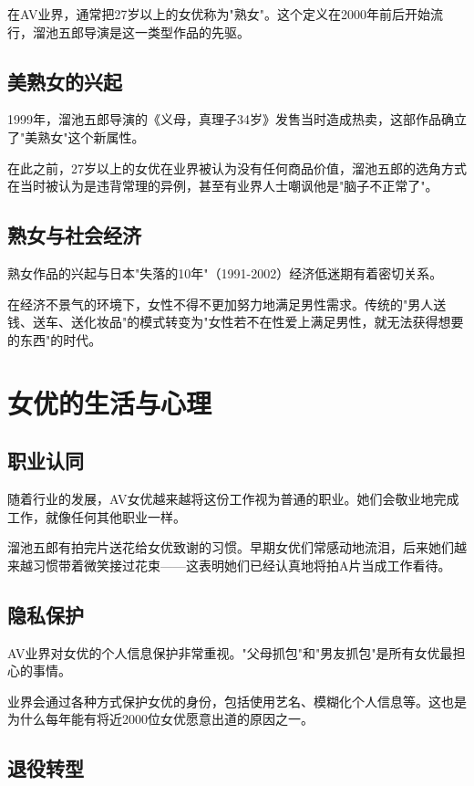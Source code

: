 \documentclass[12pt,UTF8]{ctexbook}
\begin{document}
在AV业界，通常把27岁以上的女优称为"熟女"。这个定义在2000年前后开始流行，溜池五郎导演是这一类型作品的先驱。

\section{美熟女的兴起}

1999年，溜池五郎导演的《义母，真理子34岁》发售当时造成热卖，这部作品确立了"美熟女"这个新属性。

在此之前，27岁以上的女优在业界被认为没有任何商品价值，溜池五郎的选角方式在当时被认为是违背常理的异例，甚至有业界人士嘲讽他是"脑子不正常了"。

\section{熟女与社会经济}

熟女作品的兴起与日本"失落的10年"（1991-2002）经济低迷期有着密切关系。

在经济不景气的环境下，女性不得不更加努力地满足男性需求。传统的"男人送钱、送车、送化妆品"的模式转变为"女性若不在性爱上满足男性，就无法获得想要的东西"的时代。

\chapter{女优的生活与心理}

\section{职业认同}

随着行业的发展，AV女优越来越将这份工作视为普通的职业。她们会敬业地完成工作，就像任何其他职业一样。

溜池五郎有拍完片送花给女优致谢的习惯。早期女优们常感动地流泪，后来她们越来越习惯带着微笑接过花束——这表明她们已经认真地将拍A片当成工作看待。

\section{隐私保护}

AV业界对女优的个人信息保护非常重视。"父母抓包"和"男友抓包"是所有女优最担心的事情。

业界会通过各种方式保护女优的身份，包括使用艺名、模糊化个人信息等。这也是为什么每年能有将近2000位女优愿意出道的原因之一。

\section{退役转型}
\end{document}
